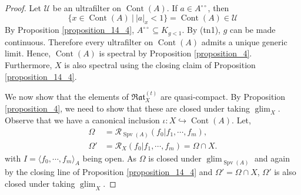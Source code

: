 \documentclass[8pt]{article}
\numberwithin{equation}{section}
\DeclareMathOperator{\glim}{glim}
\DeclareMathOperator{\Spv}{Spv}
\DeclareMathOperator{\Cont}{Cont}
\newcommand{\U}[0]{\mathcal{U}}
\newcommand{\cR}[0]{\mathcal{R}}
\newcommand{\sep}[0]{\:|\:}
\newcommand{\ab}[1]{\vert #1 \vert}
\newcommand{\cV}[0]{\mathcal{V}}
\newcommand{\dcirc}[0]{{\circ\circ}}
\newcommand{\Rat}[0]{\mathfrak{Rat}}
\begin{document}
\begin{proof}
    Let $\U$ be an ultrafilter on $\Cont(A)$. If $a\in A^\dcirc$, then 
    \begin{equation*}
        \{x\in\Cont(A)\sep \ab{a}_x<1\}=\Cont(A)\in\U 
    \end{equation*}
    By Proposition \ref{proposition_14_4}, $A^{\dcirc}\subseteq K_{g<1}$. By (tn1), $g$ can be made continuous. Therefore every ultrafilter on $\Cont(A)$ admits a unique generic limit. Hence, $\Cont(A)$ is spectral by Proposition \ref{proposition_4}. Furthermore, $X$ is also spectral using the closing claim of Proposition \ref{proposition_14_4}.
    \par We now show that the elements of $\Rat_X^{(t)}$ are quasi-compact. By Proposition \ref{proposition_4}, we need to show that these are closed under taking $\glim_X$. Observe that we have a canonical inclusion $\iota:X\hookrightarrow \Cont(A)$. Let,
    \begin{align*}
        \Omega & = \cR_{\Spv(A)}(f_0|f_1,\cdots,f_m),\\
        \Omega' &= \cR_X(f_0|f_1,\cdots,f_m)=\Omega\cap X.
    \end{align*}
    with $I=\langle f_0,\cdots,f_m\rangle_A$ being open. As $\Omega$ is closed under $\glim_{\Spv(A)}$ and again by the closing line of Proposition \ref{proposition_14_4} and $\Omega' = \Omega\cap X$, $\Omega'$ is also closed under taking $\glim_X$.%

\end{proof}
\end{document}
